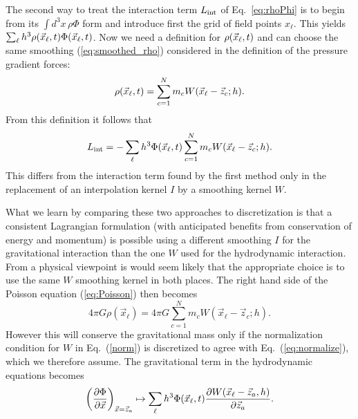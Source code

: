     The second way to treat the interaction term $L_{\rm int}$ of
Eq.~\ref{eq:rhoPhi} is to begin from its $\int\!d^3x\,\rho \Phi$ form
and introduce first the grid of field points $x_\ell$.  
    This yields $\sum_\ell h^3 \rho({\vec x}_\ell,t) \Phi({\vec x}_\ell, t)$.   
    Now we need a definition for $\rho({\vec x}_\ell,t)$ and can choose the
same smoothing (\ref{eq:smoothed_rho}) considered in the definition
of the pressure gradient forces:
    \begin{equation}\label{eq:rhogrid}
    \rho({\vec x}_\ell,t) = \sum_{c=1}^{N} m_c 
                    W( {\vec x_\ell} - {\vec z_c}; h).
    \end{equation}
    From this definition it follows that 
    \begin{equation}\label{eq:dicreteLint}
    L_{\rm int} = -\sum_\ell h^3  \Phi({\vec x}_\ell, t)
                  \sum_{c=1}^{N} m_c W({\vec x_\ell} - {\vec z_c}; h).
    \end{equation}
    This differs from the interaction term found by the first method
only in the replacement of an interpolation kernel $I$ by a smoothing
kernel $W$.
    
    What we learn by comparing these two approaches to discretization
is that a consistent Lagrangian formulation (with anticipated
benefits from conservation of energy and momentum) is possible using
a different smoothing $I$ for the gravitational interaction than the
one $W$ used for the hydrodynamic interaction.
    From a physical viewpoint is would seem likely that the
appropriate choice is to use the same $W$ smoothing kernel in both
places.
    The right hand side of the Poisson equation
(\ref{eq:Poisson}) then becomes
    \begin{equation}\label{eq:gravSource2}
    4 \pi G \rho(\vec x_\ell) =
          4 \pi G \sum_{c=1}^{N} m_c W({\vec x_\ell} - {\vec z_c}; h).
    \end{equation}
    However this will conserve the gravitational mass only if the
normalization condition for $W$ in Eq.~(\ref{norm}) is discretized to
agree with Eq.~(\ref{eq:normalize}), which we therefore assume.
    The gravitational term in the hydrodynamic equations becomes
    \begin{equation}\label{eq:gravForce}
    \left( \frac{\partial \Phi}{\partial {\vec x}} \right)_{{\vec x} = {\vec z}_a}
    \mapsto
    \sum_\ell h^3  \Phi({\vec x}_\ell, t)
         \frac{\partial W({\vec x_\ell} - {\vec z_a},h)}{\partial {\vec z}_a}.
    \end{equation}
    



